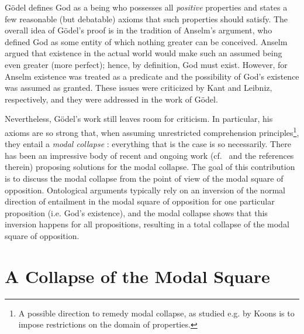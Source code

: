 \documentclass{birkmult}
\theoremstyle{definition}
\theoremstyle{remark}
\numberwithin{equation}{section}
\begin{document}
G\"{o}del defines God as a being who possesses all \emph{positive}
properties and states a few reasonable (but debatable) axioms that
such properties should satisfy.  
The overall idea of G{\"o}del's proof
is in the tradition of Anselm's argument, who defined God as some
entity of which nothing greater can be conceived. 
Anselm argued that
existence in the actual world would make 
such an assumed being even
greater (more perfect); 
hence, by definition, God must exist. However,
for Anselm existence was treated as a predicate and 
the possibility of God's existence was assumed as granted. 
These issues were criticized by Kant and Leibniz, 
respectively, and they were addressed in the work of G\"odel.

Nevertheless, G{\"o}del's work still leaves room for criticism.  In
particular, his axioms are so strong that, when assuming unrestricted
comprehension principles\footnote{A possible direction to remedy modal
  collapse, as studied e.g. by Koons
  \cite{koons06:_sobel_goedel_ontol_proof} is to impose restrictions
  on the domain of properties.}, 
they entail a \emph{modal collapse}
\cite{Sobel1987,sobel2004logic}: everything that is the case is so
necessarily.  There has been an impressive body of recent and ongoing
work
(cf.~\cite{sobel2004logic,Fitting,anderson90:_some_emend_of_goedel_ontol_proof,AndersonGettings,bjordal99,fuhrmann05:_exist_notwen,Hajek2002,Hajek2008,ContemporaryBibliography}
and the references therein) proposing solutions for the modal
collapse.  The goal of this contribution is to discuss the modal
collapse from the point of view of the modal square of opposition. 
Ontological arguments typically rely on an inversion of the normal direction of entailment
in the modal square of opposition for one particular proposition (i.e. God's existence), 
and the modal collapse shows that this inversion happens for all propositions, resulting in a total collapse of the modal square of opposition.



\section{A Collapse of the Modal Square}
\end{document}
